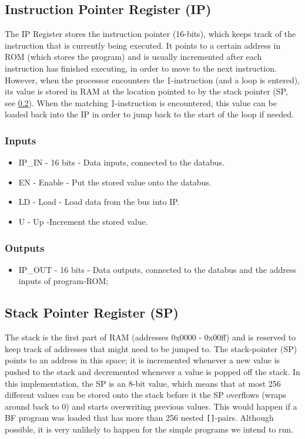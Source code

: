 \subsection{Instruction Pointer Register (IP)} \label{sec:architecture:ip}
The IP Register stores the instruction pointer (16-bits), which keeps track of the instruction that is currently being executed. It points to a certain address in ROM (which stores the program) and is usually incremented after each instruction has finished executing, in order to move to the next instruction. However, when the processor encounters the \texttt{[}-instruction (and a loop is entered), its value is stored in RAM at the location pointed to by the stack pointer (SP, see \ref{sec:architecture:sp}). When the matching \texttt{]}-instruction is encountered, this value can be loaded back into the IP in order to jump back to the start of the loop if needed.

\subsubsection*{Inputs}
\begin{itemize}
\itemsep0em 
\item IP\_IN - 16 bits - Data inputs, connected to the databus.
\item EN - Enable - Put the stored value onto the databus.
\item LD - Load - Load data from the bus into IP.
\item U - Up -Increment the stored value. 
\end{itemize}

\subsubsection*{Outputs}
\begin{itemize}
\itemsep0em 
\item IP\_OUT - 16 bits - Data outputs, connected to the databus and the address inputs of program-ROM;
\end{itemize}


\subsection{Stack Pointer Register (SP)} \label{sec:architecture:sp}
The stack is the first part of RAM (addresses 0x0000 - 0x00ff) and is reserved to keep track of addresses that might need to be jumped to. The stack-pointer (SP) points to an address in this space; it is incremented whenever a new value is pushed to the stack and decremented whenever a value is popped off the stack. In this implementation, the SP is an 8-bit value, which means that at most 256 different values can be stored onto the stack before it the SP overflows (wraps around back to 0) and starts overwriting previous values. This would happen if a BF program was loaded that has more than 256 nested \texttt{[]}-pairs. Although possible, it is very unlikely to happen for the simple programs we intend to run.


